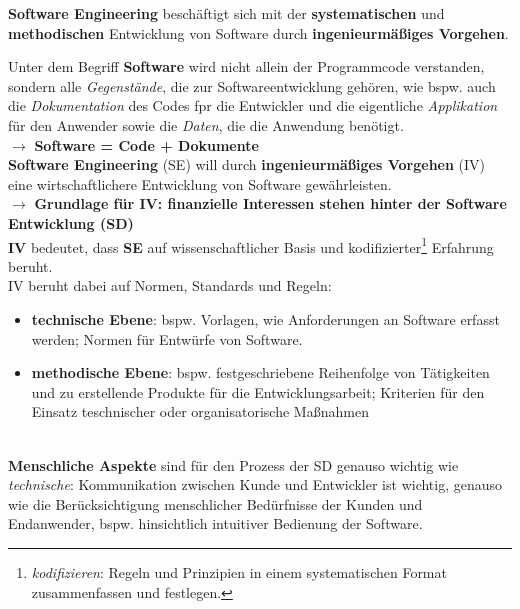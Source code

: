 

\begin{tcolorbox}[title={Software Engineering}]
    \textbf{Software Engineering} beschäftigt sich mit der \textbf{systematischen} und \textbf{methodischen} Entwicklung von Software durch \textbf{ingenieurmäßiges Vorgehen}.
\end{tcolorbox}

\noindent
Unter dem Begriff \textbf{Software} wird nicht allein der Programmcode verstanden, sondern alle \textit{Gegenstände}, die zur Softwareentwicklung gehören, wie bspw. auch die \textit{Dokumentation} des Codes fpr die Entwickler und die eigentliche \textit{Applikation} für den Anwender sowie die \textit{Daten}, die die Anwendung benötigt.\\
$\rightarrow$ \textbf{Software = Code + Dokumente}\\


\noindent
\textbf{Software Engineering} (SE) will durch \textbf{ingenieurmäßiges Vorgehen} (IV) eine wirtschaftlichere Entwicklung von Software gewährleisten.\\
$\rightarrow$ \textbf{Grundlage für IV: finanzielle Interessen stehen hinter der Software Entwicklung (SD)}\\

\noindent
\textbf{IV} bedeutet, dass \textbf{SE} auf wissenschaftlicher Basis und kodifizierter\footnote{
\textit{kodifizieren}: Regeln und Prinzipien in einem systematischen Format zusammenfassen und festlegen.
} Erfahrung beruht.\\

\noindent
IV beruht dabei auf Normen, Standards und Regeln:

\begin{itemize}
    \item\textbf{technische Ebene}: bspw. Vorlagen, wie Anforderungen an Software erfasst werden; Normen für Entwürfe von Software.
    \item \textbf{methodische Ebene}: bspw. festgeschriebene Reihenfolge von Tätigkeiten und zu erstellende Produkte für die Entwicklungsarbeit; Kriterien für den Einsatz teschnischer oder organisatorische Maßnahmen
\end{itemize}\\

\noindent
\textbf{Menschliche Aspekte} sind für den Prozess der SD genauso wichtig wie \textit{technische}: Kommunikation zwischen Kunde und Entwickler ist wichtig, genauso wie die Berücksichtigung menschlicher Bedürfnisse der Kunden und Endanwender, bspw. hinsichtlich intuitiver Bedienung der Software.
